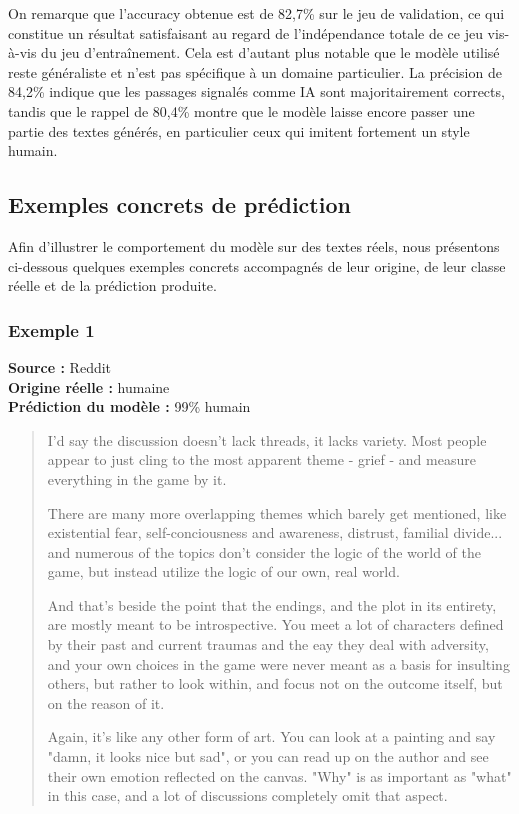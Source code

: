 ﻿\documentclass[12pt, a4paper]{report}
\begin{document}
On remarque que l'accuracy obtenue est de 82,7\% sur le jeu de validation,
ce qui constitue un résultat satisfaisant au regard de l'indépendance totale de
ce jeu vis-à-vis du jeu d'entraînement. Cela est d'autant plus notable que le
modèle utilisé reste généraliste et n'est pas spécifique à un domaine
particulier. La précision de 84,2\% indique que les passages signalés comme IA
sont majoritairement corrects, tandis que le rappel de 80,4\% montre que le
modèle laisse encore passer une partie des textes générés, en particulier ceux
qui imitent fortement un style humain.

\subsection{Exemples concrets de prédiction}

Afin d'illustrer le comportement du modèle sur des textes réels, nous
présentons ci-dessous quelques exemples concrets accompagnés de leur
origine, de leur classe réelle et de la prédiction produite.

\subsubsection{Exemple 1}

\textbf{Source :} Reddit \\
\textbf{Origine réelle :} humaine \\
\textbf{Prédiction du modèle :} 99\% humain

\begin{quote}
I'd say the discussion doesn't lack threads, it lacks variety. Most people
appear to just cling to the most apparent theme - grief - and measure
everything in the game by it.

There are many more overlapping themes which barely get mentioned, like
existential fear, self-conciousness and awareness, distrust, familial
divide... and numerous of the topics don't consider the logic of the world
of the game, but instead utilize the logic of our own, real world.

And that's beside the point that the endings, and the plot in its entirety,
are mostly meant to be introspective. You meet a lot of characters defined
by their past and current traumas and the eay they deal with adversity, and
your own choices in the game were never meant as a basis for insulting
others, but rather to look within, and focus not on the outcome itself, but
on the reason of it.

Again, it's like any other form of art. You can look at a painting and say
"damn, it looks nice but sad", or you can read up on the author and see
their own emotion reflected on the canvas. "Why" is as important as
"what" in this case, and a lot of discussions completely omit that aspect.
\end{quote}
\end{document}
